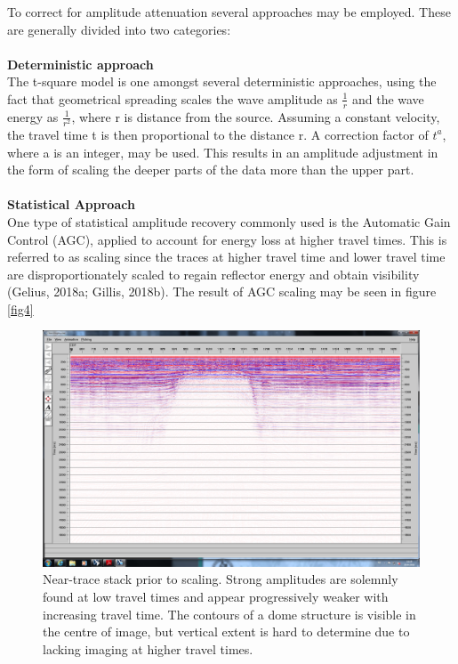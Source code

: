 \documentclass[10pt,a4paper]{article}
\begin{document}
\noindent To correct for amplitude attenuation several approaches may be employed. These are generally divided into two categories:
\\
\\
{\bf Deterministic approach}
\\
The t-square model is one amongst several deterministic approaches, using the fact that geometrical spreading scales the wave amplitude as $\frac{1}{r}$ and the wave energy as $\frac{1}{r^2}$, where r is distance from the source. Assuming a constant velocity, the travel time t is then proportional to the distance r. A correction factor of $t^a$, where a is an integer, may be used. This results in an amplitude adjustment in the form of scaling the deeper parts of the data more than the upper part.
\\
\\
{\bf Statistical Approach}
\\
One type of statistical amplitude recovery commonly used is the Automatic Gain Control (AGC), applied to account for energy loss at higher travel times. This is referred to as scaling since the traces at higher travel time and lower travel time are disproportionately scaled to regain reflector energy and obtain visibility (Gelius, 2018a; Gillis, 2018b). The result of AGC scaling may be seen in figure \ref{fig4}

\begin{figure}[H]
\includegraphics[width=\textwidth, trim={1.5cm 1.5cm 1cm 1.5cm},clip]{fig3.jpg}
\caption{Near-trace stack prior to scaling. Strong amplitudes are solemnly found at low travel times and appear progressively weaker with increasing travel time. The contours of a dome structure is visible in the centre of image, but vertical extent is hard to determine due to lacking imaging at higher travel times.}
\label{fig3}
\end{figure}
\end{document}
